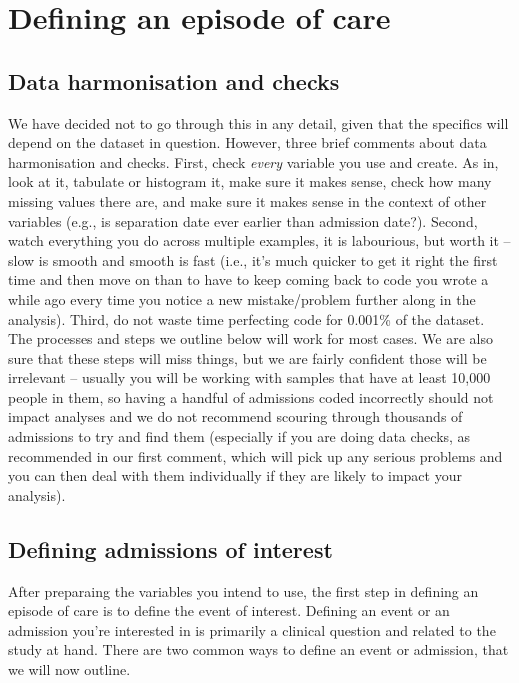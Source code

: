 \documentclass[11pt]{article}
\begin{document}
\clearpage
\section{Defining an episode of care}
\label{P1}
\subsection{Data harmonisation and checks}

We have decided not to go through this in any detail, given that the specifics
will depend on the dataset in question. However, three brief comments
about data harmonisation and checks. First, check \emph{every} variable you use and create. 
As in, look at it, tabulate or histogram it, make sure it makes sense, check how
many missing values there are, and make sure
it makes sense in the context of other variables (e.g., is separation date
ever earlier than admission date?). Second, watch everything you do across
multiple examples, it is labourious, but worth it -- slow is smooth and smooth is fast
(i.e., it's much quicker to get it right the first time and then move on 
than to have to keep coming back to code you wrote a while ago every time you notice a 
new mistake/problem further along in the analysis). Third,
do not waste time perfecting code for 0.001\% of the dataset. The processes
and steps we outline below will work for most cases. We are also sure that these steps will miss things, 
but we are fairly confident those will be irrelevant -- usually you will be working with samples
that have at least 10,000 people in them, so having a handful of admissions coded incorrectly should
not impact analyses and we do not recommend scouring through
thousands of admissions to try and find them (especially if you are doing data checks, as recommended in our 
first comment, which will pick up any serious problems and you can then deal with them
individually if they are likely to impact your analysis).

\subsection{Defining admissions of interest}

After preparaing the variables you intend to use, 
the first step in defining an episode of care is
to define the event of interest. 
Defining an event or an admission you're interested in is 
primarily a clinical question and related to the study at hand. 
There are two common ways to define an event or admission, that we will now outline. 
\end{document}

